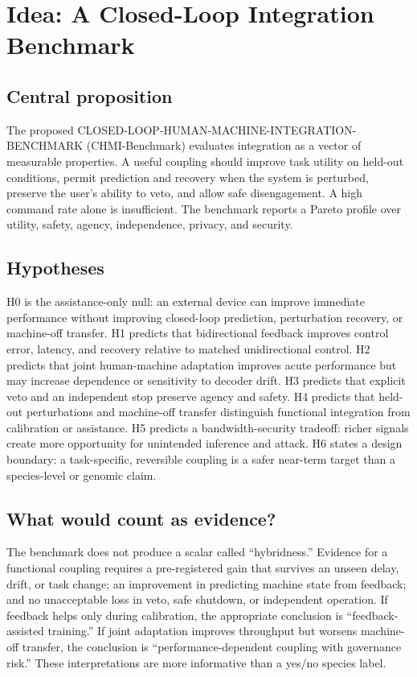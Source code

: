 \documentclass[conference]{IEEEtran}
\begin{document}
\section{Idea: A Closed-Loop Integration Benchmark}

\subsection{Central proposition}

The proposed CLOSED-LOOP-HUMAN-MACHINE-INTEGRATION-BENCHMARK (CHMI-Benchmark) evaluates integration as a vector of measurable properties. A useful coupling should improve task utility on held-out conditions, permit prediction and recovery when the system is perturbed, preserve the user's ability to veto, and allow safe disengagement. A high command rate alone is insufficient. The benchmark reports a Pareto profile over utility, safety, agency, independence, privacy, and security.

\subsection{Hypotheses}

H0 is the assistance-only null: an external device can improve immediate performance without improving closed-loop prediction, perturbation recovery, or machine-off transfer. H1 predicts that bidirectional feedback improves control error, latency, and recovery relative to matched unidirectional control. H2 predicts that joint human-machine adaptation improves acute performance but may increase dependence or sensitivity to decoder drift. H3 predicts that explicit veto and an independent stop preserve agency and safety. H4 predicts that held-out perturbations and machine-off transfer distinguish functional integration from calibration or assistance. H5 predicts a bandwidth-security tradeoff: richer signals create more opportunity for unintended inference and attack. H6 states a design boundary: a task-specific, reversible coupling is a safer near-term target than a species-level or genomic claim.

\subsection{What would count as evidence?}

The benchmark does not produce a scalar called ``hybridness.'' Evidence for a functional coupling requires a pre-registered gain that survives an unseen delay, drift, or task change; an improvement in predicting machine state from feedback; and no unacceptable loss in veto, safe shutdown, or independent operation. If feedback helps only during calibration, the appropriate conclusion is ``feedback-assisted training.'' If joint adaptation improves throughput but worsens machine-off transfer, the conclusion is ``performance-dependent coupling with governance risk.'' These interpretations are more informative than a yes/no species label.
\end{document}
